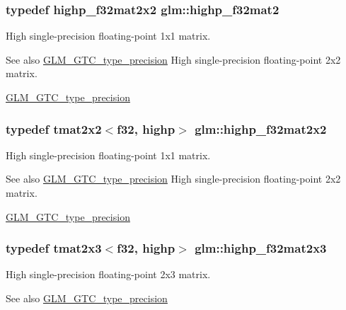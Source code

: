 \subsubsection[{highp\+\_\+f32mat2}]{\setlength{\rightskip}{0pt plus 5cm}typedef {\bf highp\+\_\+f32mat2x2} {\bf glm\+::highp\+\_\+f32mat2}}\label{namespaceglm_aed934f561aaf8ad891c0a8f5e719aea8}
High single-\/precision floating-\/point 1x1 matrix. \begin{DoxySeeAlso}{See also}
\hyperlink{group__gtc__type__precision}{G\+L\+M\+\_\+\+G\+T\+C\+\_\+type\+\_\+precision} High single-\/precision floating-\/point 2x2 matrix. 

\hyperlink{group__gtc__type__precision}{G\+L\+M\+\_\+\+G\+T\+C\+\_\+type\+\_\+precision} 
\end{DoxySeeAlso}
\hypertarget{namespaceglm_ab78dad85a95f5fcf418769d76c8fbad1}{}
\subsubsection[{highp\+\_\+f32mat2x2}]{\setlength{\rightskip}{0pt plus 5cm}typedef tmat2x2$<${\bf f32}, highp$>$ {\bf glm\+::highp\+\_\+f32mat2x2}}\label{namespaceglm_ab78dad85a95f5fcf418769d76c8fbad1}
High single-\/precision floating-\/point 1x1 matrix. \begin{DoxySeeAlso}{See also}
\hyperlink{group__gtc__type__precision}{G\+L\+M\+\_\+\+G\+T\+C\+\_\+type\+\_\+precision} High single-\/precision floating-\/point 2x2 matrix. 

\hyperlink{group__gtc__type__precision}{G\+L\+M\+\_\+\+G\+T\+C\+\_\+type\+\_\+precision} 
\end{DoxySeeAlso}
\hypertarget{namespaceglm_a6dd41ee79c5e18a722ae8d27e86179cb}{}
\subsubsection[{highp\+\_\+f32mat2x3}]{\setlength{\rightskip}{0pt plus 5cm}typedef tmat2x3$<${\bf f32}, highp$>$ {\bf glm\+::highp\+\_\+f32mat2x3}}\label{namespaceglm_a6dd41ee79c5e18a722ae8d27e86179cb}
High single-\/precision floating-\/point 2x3 matrix. \begin{DoxySeeAlso}{See also}
\hyperlink{group__gtc__type__precision}{G\+L\+M\+\_\+\+G\+T\+C\+\_\+type\+\_\+precision} 
\end{DoxySeeAlso}
\hypertarget{namespaceglm_a33881add501a1c4b3a6a9706bc376310}{}

